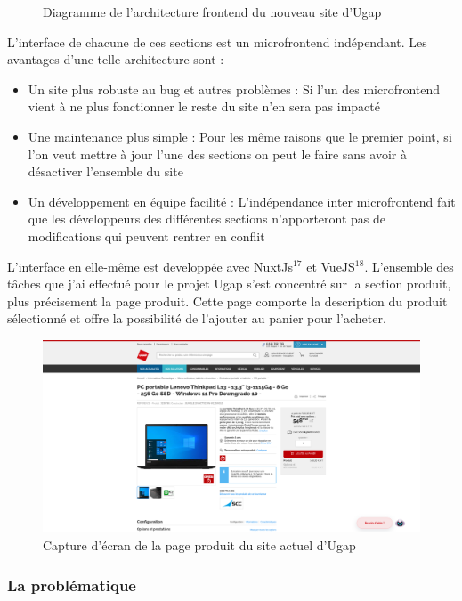 \documentclass[12pt]{article}
\begin{document}
\begin {sloppypar}
\begin{figure}[h]
  \caption {Diagramme de l'architecture frontend du nouveau site d'Ugap}
\end{figure}
L'interface de chacune de ces sections est un microfrontend indépendant. Les avantages d'une telle 
architecture sont : 
\begin{itemize}
  \item 
    Un site plus robuste au bug et autres problèmes : Si l'un des microfrontend vient à ne plus 
    fonctionner le reste du site n'en sera pas impacté
  \item 
    Une maintenance plus simple : Pour les même raisons que le premier point, si l'on veut 
    mettre à jour l'une des sections on peut le faire sans avoir à désactiver l'ensemble du site 
  \item 
    Un développement en équipe facilité : L'indépendance inter microfrontend fait que les développeurs 
    des différentes sections n'apporteront pas de modifications qui peuvent rentrer en conflit
\end{itemize}
L'interface en elle-même est developpée avec NuxtJs$^{17}$ et VueJS$^{18}$. L'ensemble des tâches 
que j'ai effectué pour le projet Ugap s'est concentré sur la section produit, plus précisement 
la page produit. Cette page comporte la description du produit sélectionné et offre la possibilité 
de l'ajouter au panier pour l'acheter.
\begin{figure}[h]
  \includegraphics[width=\textwidth] {sc_product-page.png}
  \caption {Capture d'écran de la page produit du site actuel d'Ugap}
\end{figure}
\newpage 
\subsubsection{La problématique}

\end{sloppypar}
\end{document}
